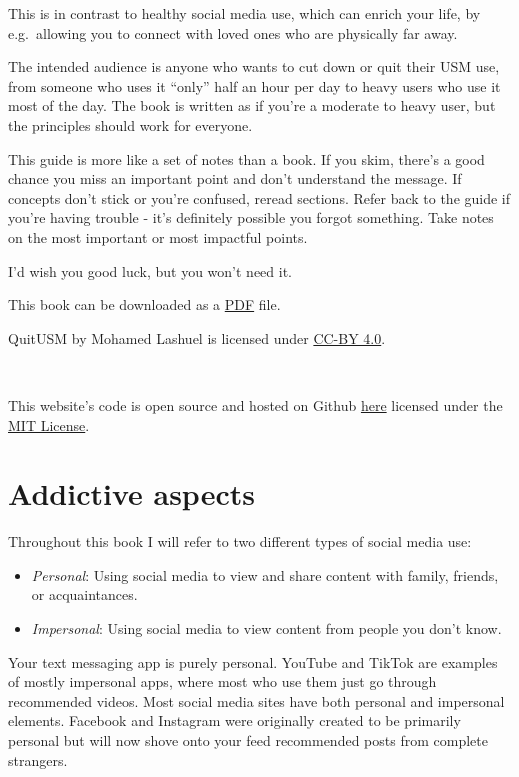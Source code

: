 \documentclass[
  openany]{book}
\providecommand{\tightlist}{%
  \setlength{\itemsep}{0pt}\setlength{\parskip}{0pt}}
\begin{document}
This is in contrast to healthy social media use, which can enrich your life, by e.g.~allowing you to connect with loved ones who are physically far away.

The intended audience is anyone who wants to cut down or quit their USM use, from someone who uses it ``only'' half an hour per day to heavy users who use it most of the day. The book is written as if you're a moderate to heavy user, but the principles should work for everyone.

This guide is more like a set of notes than a book. If you skim, there's a good chance you miss an important point and don't understand the message. If concepts don't stick or you're confused, reread sections. Refer back to the guide if you're having trouble - it's definitely possible you forgot something. Take notes on the most important or most impactful points.

I'd wish you good luck, but you won't need it.

This book can be downloaded as a \href{main.pdf}{PDF} file.

QuitUSM by Mohamed Lashuel is licensed under \href{https://creativecommons.org/licenses/by/4.0/}{CC-BY 4.0}.

\includegraphics[width=0in,height=\textheight,keepaspectratio]{images/cc.png}

This website's code is open source and hosted on Github \href{https://github.com/MohamedLashuel/QuitUSM/}{here} licensed under the \href{https://github.com/MohamedLashuel/QuitUSM/blob/main/LICENSE}{MIT License}.

\chapter{Addictive aspects}\label{why-addictive}

Throughout this book I will refer to two different types of social media use:

\begin{itemize}
\tightlist
\item
  \emph{Personal}: Using social media to view and share content with family, friends, or acquaintances.
\item
  \emph{Impersonal}: Using social media to view content from people you don't know.
\end{itemize}

Your text messaging app is purely personal. YouTube and TikTok are examples of mostly impersonal apps, where most who use them just go through recommended videos. Most social media sites have both personal and impersonal elements. Facebook and Instagram were originally created to be primarily personal but will now shove onto your feed recommended posts from complete strangers.
\end{document}
